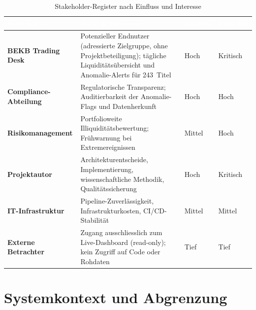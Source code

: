 \documentclass[11pt, a4paper, oneside, openany]{report}
\begin{document}
\begin{table}[H]
\centering
\caption{Stakeholder-Register nach Einfluss und Interesse}
\label{tab:stakeholders}
\sffamily\small
\begin{tabularx}{\textwidth}{>{\bfseries}l X l l}
  \toprule
  \rowcolor{DeepNavy} \textcolor{white}{\textbf{Stakeholder}} & \textcolor{white}{\textbf{Rolle \& Interesse}} & \textcolor{white}{\textbf{Einfluss}} & \textcolor{white}{\textbf{Priorität}} \\
  \midrule
  BEKB Trading Desk     & Potenzieller Endnutzer (adressierte Zielgruppe, ohne Projektbeteiligung); tägliche Liquiditätsübersicht und Anomalie-Alerts für 243~Titel & Hoch   & Kritisch \\
  Compliance-Abteilung  & Regulatorische Transparenz; Auditierbarkeit der Anomalie-Flags und Datenherkunft                                   & Hoch   & Hoch \\
  Risikomanagement      & Portfolioweite Illiquiditätsbewertung; Frühwarnung bei Extremereignissen                                            & Mittel & Hoch \\
  Projektautor          & Architekturentscheide, Implementierung, wissenschaftliche Methodik, Qualitätssicherung                              & Hoch   & Kritisch \\
  IT-Infrastruktur      & Pipeline-Zuverlässigkeit, Infrastrukturkosten, CI/CD-Stabilität                                                     & Mittel & Mittel \\
  Externe Betrachter    & Zugang ausschliesslich zum Live-Dashboard (read-only); kein Zugriff auf Code oder Rohdaten                          & Tief   & Tief \\
  \bottomrule
\end{tabularx}
\end{table}

\section{Systemkontext und Abgrenzung}
\label{sec:kontext}
\end{document}
